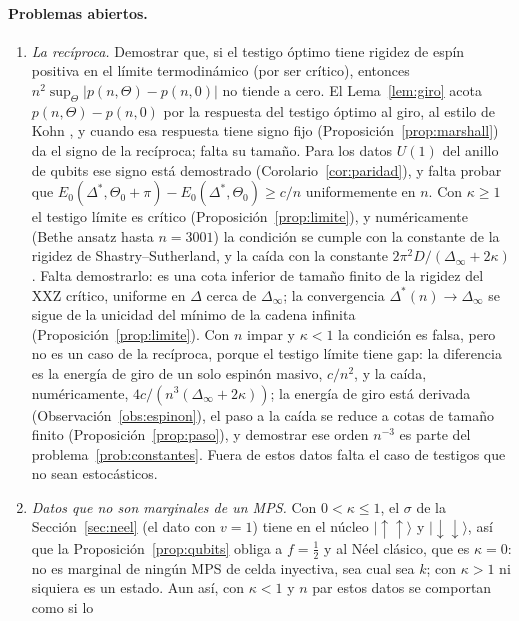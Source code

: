 \documentclass[11pt,a4paper]{article}
\theoremstyle{remark}
\newcommand{\ket}[1]{|#1\rangle}
\begin{document}
\paragraph{Problemas abiertos.}
\begin{enumerate}
\item\label{prob:reciproca} \emph{La recíproca.} Demostrar que, si el testigo óptimo tiene rigidez de espín positiva en
  el límite termodinámico (por ser crítico), entonces $n^2\sup_\Theta|p(n,\Theta)-p(n,0)|$ no tiende a
  cero. El Lema~\ref{lem:giro} acota $p(n,\Theta)-p(n,0)$ por la respuesta del testigo óptimo al
  giro, al estilo de Kohn \cite{kohn}, y cuando esa respuesta tiene signo fijo
  (Proposición~\ref{prop:marshall}) da el signo de la recíproca; falta su tamaño. Para los datos $U(1)$ del anillo de qubits ese signo está demostrado
  (Corolario~\ref{cor:paridad}), y falta probar que
  $E_0(\Delta^\ast,\Theta_0+\pi)-E_0(\Delta^\ast,\Theta_0)\ge c/n$ uniformemente en $n$. Con
  $\kappa\ge1$ el testigo límite es crítico (Proposición~\ref{prop:limite}), y numéricamente
  (Bethe ansatz hasta $n=3001$) la condición se cumple con la constante de la rigidez de
  Shastry--Sutherland, y la caída con la constante $2\pi^2D/(\Delta_\infty+2\kappa)$. Falta
  demostrarlo: es una cota inferior de tamaño finito de la rigidez del XXZ crítico, uniforme en
  $\Delta$ cerca de $\Delta_\infty$; la convergencia $\Delta^\ast(n)\to\Delta_\infty$ se
  sigue de la unicidad del mínimo de la cadena infinita (Proposición~\ref{prop:limite}).
  Con $n$ impar y $\kappa<1$ la condición es falsa, pero no es un caso de la recíproca, porque el
  testigo límite tiene gap: la diferencia es la energía de giro de un solo espinón masivo, $c/n^2$,
  y la caída, numéricamente, $4c/(n^3(\Delta_\infty+2\kappa))$; la energía de giro está derivada
  (Observación~\ref{obs:espinon}), el paso a la caída se reduce a cotas de tamaño finito
  (Proposición~\ref{prop:paso}), y demostrar ese orden $n^{-3}$ es parte del
  problema~\ref{prob:constantes}. Fuera de estos datos falta el caso de testigos que no
  sean estocásticos.
\item\label{prob:nomps} \emph{Datos que no son marginales de un MPS.} Con $0<\kappa\le1$, el $\sigma$ de la
  Sección~\ref{sec:neel} (el dato con $v=1$) tiene en el núcleo $\ket{\uparrow\uparrow}$ y
  $\ket{\downarrow\downarrow}$, así que la Proposición~\ref{prop:qubits} obliga a $f=\tfrac12$ y al Néel
  clásico, que es $\kappa=0$: no es marginal de ningún MPS de celda inyectiva, sea cual sea $k$; con
  $\kappa>1$ ni siquiera es un estado. Aun así, con $\kappa<1$ y $n$ par estos datos se comportan como si lo

\end{enumerate}
\end{document}
